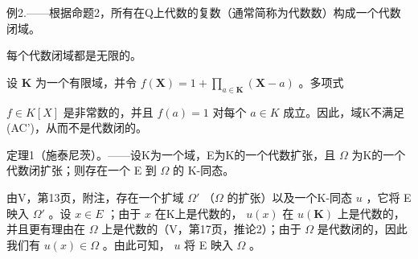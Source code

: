 例2.——根据命题2，所有在Q上代数的复数（通常简称为代数数）构成一个代数闭域。

每个代数闭域都是无限的。

设 \(\mathbf{K}\) 为一个有限域，并令 \(f(\mathbf{X}) = 1 + \prod_{a\in \mathbf{K}}(\mathbf{X} - a)\) 。多项式

\(f \in K[X]\) 是非常数的，并且 \(f(a) = 1\) 对每个 \(a \in K\) 成立。因此，域K不满足(AC')，从而不是代数闭的。

定理1（施泰尼茨）。——设K为一个域，E为K的一个代数扩张，且 \(\Omega\) 为K的一个代数闭扩张；则存在一个 E 到 \(\Omega\) 的 K-同态。

由V，第13页，附注，存在一个扩域 \(\Omega'\) （\(\Omega\) 的扩张）以及一个K-同态 \(u\) ，它将 E 映入 \(\Omega'\) 。设 \(x \in E\) ；由于 \(x\) 在K上是代数的， \(u(x)\) 在 \(u(\mathbf{K})\) 上是代数的，并且更有理由在 \(\Omega\) 上是代数的（V，第17页，推论2）；由于 \(\Omega\) 是代数闭的，因此我们有 \(u(x) \in \Omega\) 。由此可知， \(u\) 将 E 映入 \(\Omega\) 。

